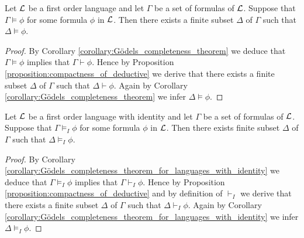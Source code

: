 \documentclass[10pt]{amsart}
\begin{document}
\begin{corollary}\label{theorem:compactness_without_identity}
	Let ${\mathcal L}$ be a first order language and let $\Gamma$ be a set of formulas of ${\mathcal L}$. Suppose that $\Gamma \vDash \phi$ for some formula $\phi$ in ${\mathcal L}$. Then there exists a finite subset $\Delta$ of $\Gamma$ such that $\Delta \vDash \phi$.
\end{corollary}
\begin{proof}
	By Corollary \ref{corollary:Gödels_completeness_theorem} we deduce that $\Gamma \vDash \phi$ implies that $\Gamma \vdash \phi$. Hence by Proposition \ref{proposition:compactness_of_deductive} we derive that there exists a finite subset $\Delta$ of $\Gamma$ such that $\Delta \vdash \phi$. Again by Corollary \ref{corollary:Gödels_completeness_theorem} we infer $\Delta \vDash \phi$.
\end{proof}

\begin{corollary}\label{theorem:compactness_for_languages_with_identity}
	Let ${\mathcal L}$ be a first order language with identity and let $\Gamma$ be a set of formulas of ${\mathcal L}$. Suppose that $\Gamma \vDash_I \phi$ for some formula $\phi$ in ${\mathcal L}$. Then there exists finite subset $\Delta$ of $\Gamma$ such that $\Delta \vDash_I \phi$.
\end{corollary}
\begin{proof}
	By Corollary \ref{corollary:Gödels_completeness_theorem_for_languages_with_identity} we deduce that $\Gamma \vDash_I \phi$ implies that $\Gamma \vdash_I \phi$. Hence by Proposition \ref{proposition:compactness_of_deductive} and by definition of $\vdash_I$ we derive that there exists a finite subset $\Delta$ of $\Gamma$ such that $\Delta \vdash_I \phi$. Again by Corollary \ref{corollary:Gödels_completeness_theorem_for_languages_with_identity} we infer $\Delta \vDash_I \phi$.
\end{proof}



\small


\end{document}
